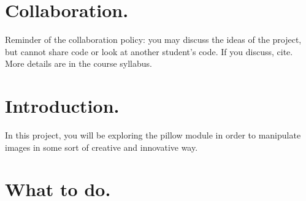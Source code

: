 \documentclass[11pt, letterpaper, onecolumn, oneside, final]{article}
\begin{document}
    \maketitle



    \section{Collaboration.} Reminder of the collaboration policy: you may discuss the ideas of the project, but cannot share code or look at another student’s code. If you discuss, cite. More details are in the course syllabus. 

    \section{Introduction.} In this project, you will be exploring the {\consolas pillow} module in order to manipulate images in some sort of creative and innovative way. 
     
    \section{What to do.} %
    
\end{document}

